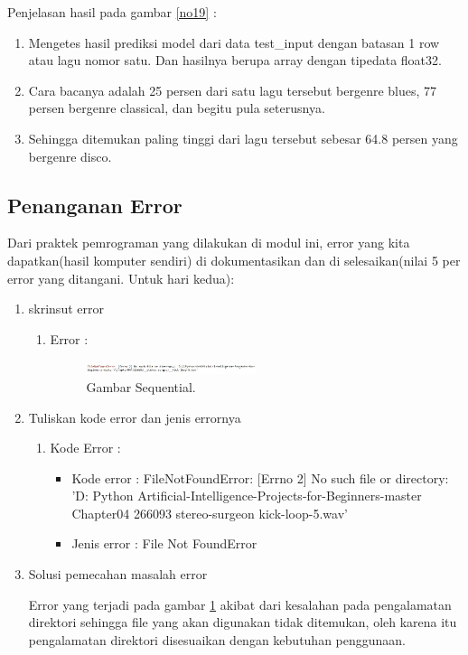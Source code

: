 \begin{enumerate}
	\par Penjelasan hasil pada gambar \ref{no19} :
	\begin{enumerate}
	\item Mengetes hasil prediksi model dari data test\_input dengan batasan 1 row atau lagu nomor satu. Dan hasilnya berupa array dengan tipedata float32.
	\item Cara bacanya adalah 25 persen dari satu lagu tersebut bergenre blues, 77 persen bergenre classical, dan begitu pula seterusnya.
	\item Sehingga ditemukan paling tinggi dari lagu tersebut sebesar 64.8 persen yang bergenre disco.
	\end{enumerate}
\end{enumerate}

\subsection{Penanganan Error}
Dari praktek pemrograman yang dilakukan di modul ini, error yang kita dapatkan(hasil komputer sendiri) di dokumentasikan dan di selesaikan(nilai 5 per error yang ditangani. Untuk hari kedua):

\begin{enumerate}
	\item skrinsut error
		\begin{enumerate}
		\item Error :
			\begin{figure}[ht]
			\centerline{\includegraphics[width=0.5\textwidth]{figures/chapter6/error.jpg}}
			\caption{Gambar Sequential.}
			\label{error}
			\end{figure}
		\end{enumerate}
		
	\item Tuliskan kode error dan jenis errornya
		\begin{enumerate}
		\item Kode Error  :
			\begin{itemize}
				\item Kode error : FileNotFoundError: [Errno 2] No such file or directory: 'D: Python Artificial-Intelligence-Projects-for-Beginners-master  Chapter04 266093 stereo-surgeon kick-loop-5.wav'
				\item Jenis error : File Not FoundError
			\end{itemize}
		\end{enumerate}

	\item Solusi pemecahan masalah error
		\par Error yang terjadi pada gambar \ref{error} akibat dari kesalahan pada pengalamatan direktori sehingga file yang akan digunakan tidak ditemukan, oleh karena itu pengalamatan direktori disesuaikan dengan kebutuhan penggunaan.
	
		
\end{enumerate}
